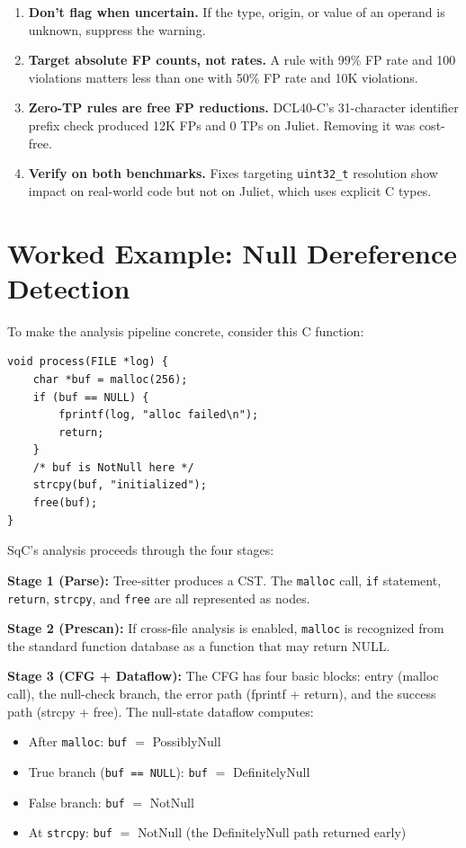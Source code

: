 \documentclass[10pt,twocolumn,letterpaper]{article}
\begin{document}
\begin{enumerate}
    \item \textbf{Don't flag when uncertain.}  If the type, origin,
        or value of an operand is unknown, suppress the warning.
    \item \textbf{Target absolute FP counts, not rates.}  A rule with
        99\% FP rate and 100 violations matters less than one with
        50\% FP rate and 10K violations.
    \item \textbf{Zero-TP rules are free FP reductions.}  DCL40-C's
        31-character identifier prefix check produced 12K FPs and 0 TPs
        on Juliet.  Removing it was cost-free.
    \item \textbf{Verify on both benchmarks.}  Fixes targeting
        \texttt{uint32\_t} resolution show impact on real-world code
        but not on Juliet, which uses explicit C types.
\end{enumerate}

\section{Worked Example: Null Dereference Detection}
\label{sec:worked-example}

To make the analysis pipeline concrete, consider this C function:

\begin{lstlisting}
void process(FILE *log) {
    char *buf = malloc(256);
    if (buf == NULL) {
        fprintf(log, "alloc failed\n");
        return;
    }
    /* buf is NotNull here */
    strcpy(buf, "initialized");
    free(buf);
}
\end{lstlisting}

SqC's analysis proceeds through the four stages:

\textbf{Stage 1 (Parse):} Tree-sitter produces a CST.  The
\texttt{malloc} call, \texttt{if} statement, \texttt{return},
\texttt{strcpy}, and \texttt{free} are all represented as nodes.

\textbf{Stage 2 (Prescan):} If cross-file analysis is enabled,
\texttt{malloc} is recognized from the standard function database
as a function that may return NULL.

\textbf{Stage 3 (CFG + Dataflow):} The CFG has four basic blocks:
entry (malloc call), the null-check branch, the error path (fprintf +
return), and the success path (strcpy + free).  The null-state dataflow
computes:
\begin{itemize}
    \item After \texttt{malloc}: \texttt{buf} $=$ PossiblyNull
    \item True branch (\texttt{buf == NULL}): \texttt{buf} $=$ DefinitelyNull
    \item False branch: \texttt{buf} $=$ NotNull
    \item At \texttt{strcpy}: \texttt{buf} $=$ NotNull (the DefinitelyNull
        path returned early)
\end{itemize}
\end{document}
